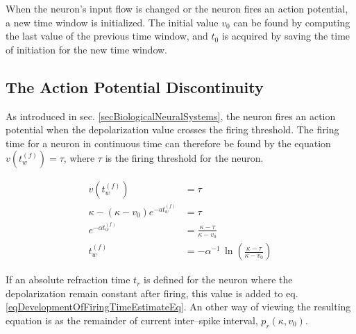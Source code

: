 		When the neuron's input flow is changed or the neuron fires an action potential, a new time window is initialized.
		The initial value $v_0$ can be found by computing the last value of the previous time window, and $t_0$ is acquired by saving the time of initiation for the new time window\cite{FDP_report}.



	\subsection{The Action Potential Discontinuity}
	\label{ssecTheActionPotential}
	As introduced in sec. \ref{secBiologicalNeuralSystems}, the neuron fires an action potential when the depolarization value crosses the firing threshold.
	The firing time for a neuron in continuous time can therefore be found by the equation $v(t_w^{(f)}) = \tau$, where $\tau$ is the firing threshold for the neuron.

	\begin{equation}
		\begin{split}
				v\left(t_w^{(f)}\right)			 							&= \tau \qquad 										\\	%
				\kappa - \left( \kappa - v_0 \right) e^{-at_w^{(f)}}  		&= \tau 											\\
				e^{-\alpha t_w^{(f)}} 			 						&= \frac{\kappa - \tau}{\kappa - v_0} 					\\
				t_w^{(f)}													&= -\alpha^{-1} \, \ln \left( \frac{\kappa - \tau}{\kappa - v_0} \right) 					
		\end{split}
		\label{eqDevelopmentOfFiringTimeEstimateEq}
	\end{equation}

	If an absolute refraction time $t_r$ is defined for the neuron where the depolarization remain constant after firing, this value is added to eq. \eqref{eqDevelopmentOfFiringTimeEstimateEq}.
	An other way of viewing the resulting equation is as the remainder of current inter--spike interval, $p_r(\kappa, v_0)$.

